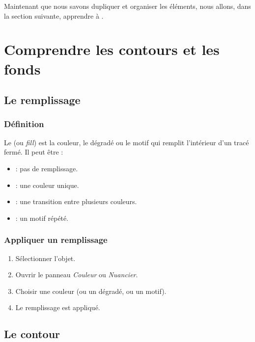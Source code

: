 Maintenant que nous savons dupliquer et organiser les éléments, nous allons, dans la section suivante, apprendre à .

\section{Comprendre les contours et les fonds}

\subsection{Le remplissage}

\subsubsection{Définition}

Le  (ou \emph{fill}) est la couleur, le dégradé ou le motif qui remplit l'intérieur d'un tracé fermé. Il peut être :

\begin{itemize}
    \item {} : pas de remplissage.
    \item {} : une couleur unique.
    \item {} : une transition entre plusieurs couleurs.
    \item {} : un motif répété.
\end{itemize}

\subsubsection{Appliquer un remplissage}

\begin{enumerate}
    \item Sélectionner l'objet.
    \item Ouvrir le panneau \emph{Couleur} ou \emph{Nuancier}.
    \item Choisir une couleur (ou un dégradé, ou un motif).
    \item Le remplissage est appliqué.
\end{enumerate}

\subsection{Le contour}

